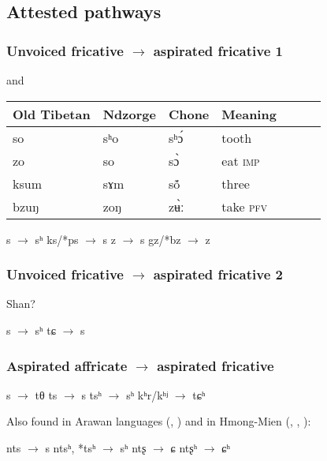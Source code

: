 \documentclass[oldfontcommands,oneside,a4paper,11pt]{article}
\newcommand{\ipa}[1]{{\phon \mbox{#1}}} %
\begin{document}
\subsection{Attested pathways}
 

\subsubsection{Unvoiced  fricative $\rightarrow$ aspirated fricative 1}

\citet{sun86ndzorge} and \citet{jacques14cone} 

\begin{table}[H] \centering
\begin{tabular}{lllllll}
\toprule
Old Tibetan& Ndzorge& Chone & Meaning \\
\midrule

so & \ipa{sʰo}& \ipa{sʰɔ́} &tooth \\
zo & \ipa{so}& \ipa{sɔ̀} &eat \textsc{imp} \\
ksum & \ipa{sɤm}& \ipa{sṍ} &three \\
bzuŋ & \ipa{zoŋ}& \ipa{zʉ̀ː} &take \textsc{pfv}\\
\bottomrule
\end{tabular}
\end{table}
\begin{exe}
\ex 
\glt *s $\rightarrow$ sʰ
\glt *ks/*ps $\rightarrow$ s
\glt *z $\rightarrow$ s
\glt *gz/*bz $\rightarrow$ z
\end{exe}

\subsubsection{Unvoiced  fricative $\rightarrow$ aspirated fricative 2}
Shan?
\begin{exe}
\ex 
\glt *s $\rightarrow$ sʰ
\glt *tɕ $\rightarrow$ s
\end{exe}

\subsubsection{Aspirated affricate $\rightarrow$ aspirated fricative}
\begin{exe}
\ex 
\glt *s $\rightarrow$ tθ
\glt *ts $\rightarrow$ s
\glt *tsʰ $\rightarrow$ sʰ
\glt *kʰr/kʰʲ $\rightarrow$ tɕʰ
\end{exe}
\citet{wang79miaoyu}

Also found in Arawan languages (\citealt{dixon04arawa}, \citealt{dienst05kulina}) and in Hmong-Mien (\citealt{wang79miaoyu}, \citealt{ratliff10protohm}, \citealt{carveth13aspirated}):
\begin{exe}
\ex 
\glt *nts $\rightarrow$ s
\glt *ntsʰ, *tsʰ $\rightarrow$ sʰ
\glt *ntʂ $\rightarrow$ ɕ
\glt *ntʂʰ $\rightarrow$ ɕʰ
\end{exe}
\end{document}
